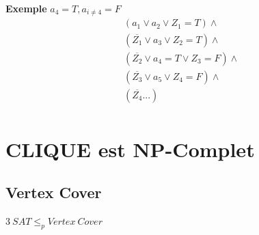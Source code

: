 \documentclass[a4paper,12pt]{article}
\begin{document}
    \textbf{Exemple}
    $a_4 = T, a_{i \neq 4} = F$
    \begin{align*}
      &(a_1 \vee a_2 \vee Z_1 \mathit{= T}) \wedge \\
      &(\overline{Z_1} \vee a_3 \vee Z_2 \mathit{= T}) \wedge \\
      &(\overline{Z_2} \vee a_4 \mathit{= T} \vee Z_3 \mathit{= F}) \wedge \\
      &(\overline{Z_3} \vee a_5\vee Z_4 \mathit{= F}) \wedge \\
      &(\overline{Z_4} ...) \\
    \end{align*}


\section{CLIQUE est NP-Complet}

  \subsection{Vertex Cover}
    $3\ SAT \leq_p Vertex\ Cover$
\end{document}
